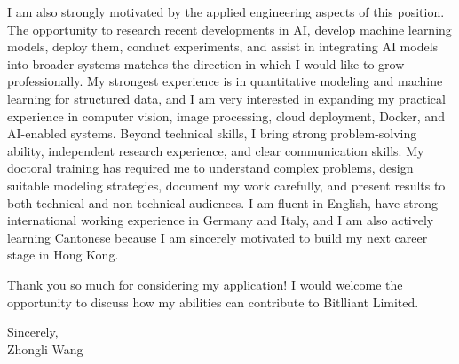 \documentclass[11pt]{article}
\begin{document}
I am also strongly motivated by the applied engineering aspects of this position. The opportunity to research recent developments in AI, develop machine learning models, deploy them, conduct experiments, and assist in integrating AI models into broader systems matches the direction in which I would like to grow professionally. My strongest experience is in quantitative modeling and machine learning for structured data, and I am very interested in expanding my practical experience in computer vision, image processing, cloud deployment, Docker, and AI-enabled systems. 
Beyond technical skills, I bring strong problem-solving ability, independent research experience, and clear communication skills. My doctoral training has required me to understand complex problems, design suitable modeling strategies, document my work carefully, and present results to both technical and non-technical audiences. I am fluent in English, have strong international working experience in Germany and Italy, and I am also actively learning Cantonese because I am sincerely motivated to build my next career stage in Hong Kong.

Thank you so much for considering my application! I would welcome the opportunity to discuss how my abilities can contribute to Bitlliant Limited.

\vspace{0.15cm}

\noindent Sincerely, \\[0.7cm]
\noindent Zhongli Wang
\end{document}
